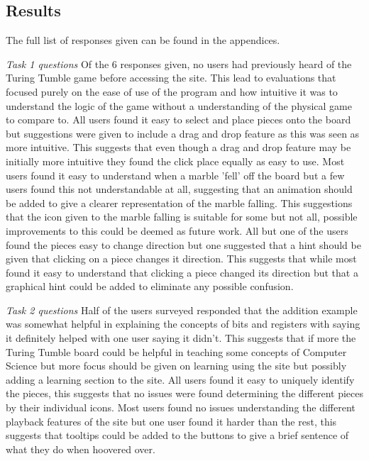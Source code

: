 \documentclass{l4proj}
\begin{document}
\subsection{Results}
The full list of responses given can be found in the appendices.

\emph{Task 1 questions}
Of the 6 responses given, no users had previously heard of the Turing Tumble game before accessing the site. This lead to evaluations that focused purely on the ease of use of the program and how intuitive it was to understand the logic of the game without a understanding of the physical game to compare to. All users found it easy to select and place pieces onto the board but suggestions were given to include a drag and drop feature as this was seen as more intuitive. This suggests that even though a drag and drop feature may be initially more intuitive they found the click place equally as easy to use. Most users found it easy to understand when a marble 'fell' off the board but a few users found this not understandable at all, suggesting that an animation should be added to give a clearer representation of the marble falling. This suggestions that the icon given to the marble falling is suitable for some but not all, possible improvements to this could be deemed as future work. All but one of the users found the pieces easy to change direction but one suggested that a hint should be given that clicking on a piece changes it direction. This suggests that while most found it easy to understand that clicking a piece changed its direction but that a graphical hint could be added to eliminate any possible confusion.

\emph{Task 2 questions}
Half of the users surveyed responded that the addition example was somewhat helpful in explaining the concepts of bits and registers with saying it definitely helped with one user saying it didn't. This suggests that if more the Turing Tumble board could be helpful in teaching some concepts of Computer Science but more focus should be given on learning using the site but possibly adding a learning section to the site. All users found it easy to uniquely identify the pieces, this suggests that no issues were found determining the different pieces by their individual icons. Most users found no issues understanding the different playback features of the site but one user found it harder than the rest, this suggests that tooltips could be added to the buttons to give a brief sentence of what they do when hoovered over.   
\end{document}
